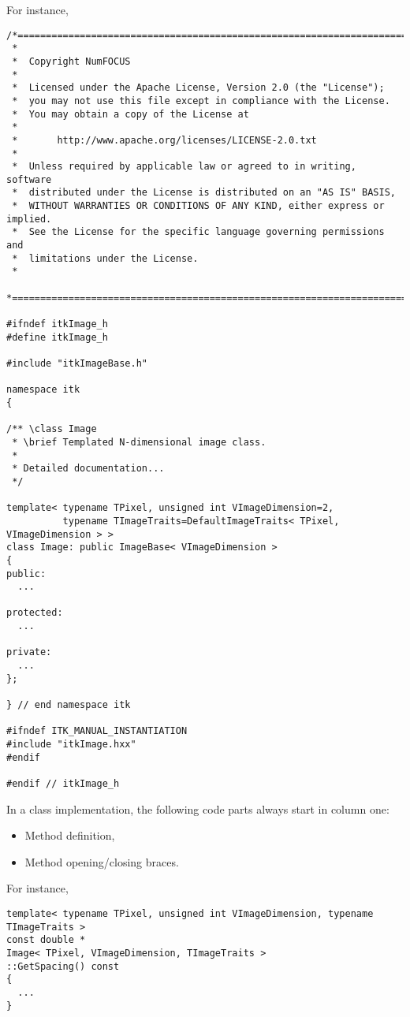 For instance,

\small
\begin{verbatim}
/*=========================================================================
 *
 *  Copyright NumFOCUS
 *
 *  Licensed under the Apache License, Version 2.0 (the "License");
 *  you may not use this file except in compliance with the License.
 *  You may obtain a copy of the License at
 *
 *       http://www.apache.org/licenses/LICENSE-2.0.txt
 *
 *  Unless required by applicable law or agreed to in writing, software
 *  distributed under the License is distributed on an "AS IS" BASIS,
 *  WITHOUT WARRANTIES OR CONDITIONS OF ANY KIND, either express or implied.
 *  See the License for the specific language governing permissions and
 *  limitations under the License.
 *
 *=========================================================================*/

#ifndef itkImage_h
#define itkImage_h

#include "itkImageBase.h"

namespace itk
{

/** \class Image
 * \brief Templated N-dimensional image class.
 *
 * Detailed documentation...
 */

template< typename TPixel, unsigned int VImageDimension=2,
          typename TImageTraits=DefaultImageTraits< TPixel, VImageDimension > >
class Image: public ImageBase< VImageDimension >
{
public:
  ...

protected:
  ...

private:
  ...
};

} // end namespace itk

#ifndef ITK_MANUAL_INSTANTIATION
#include "itkImage.hxx"
#endif

#endif // itkImage_h
\end{verbatim}
\normalsize

In a class implementation, the following code parts always start in column one:
\begin{itemize}
\item Method definition,
\item Method opening/closing braces.
\end{itemize}

For instance,

\small
\begin{verbatim}
template< typename TPixel, unsigned int VImageDimension, typename TImageTraits >
const double *
Image< TPixel, VImageDimension, TImageTraits >
::GetSpacing() const
{
  ...
}
\end{verbatim}
\normalsize

